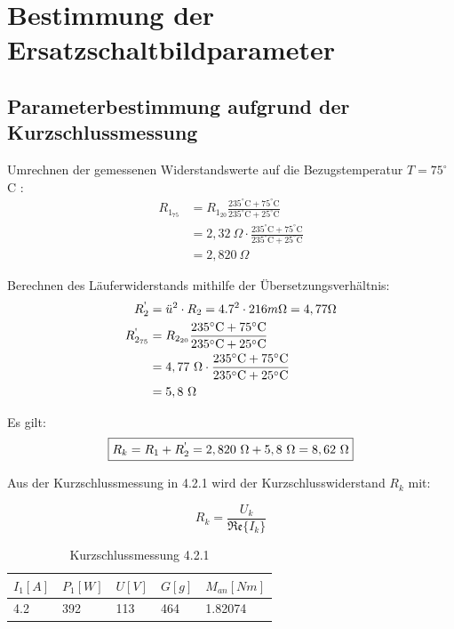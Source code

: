 \documentclass[conference]{IEEEtran}
\begin{document}
\section{Bestimmung der Ersatzschaltbildparameter}
\subsection{Parameterbestimmung aufgrund der Kurzschlussmessung}

Umrechnen der gemessenen Widerstandswerte auf die Bezugstemperatur $T=75^\circ$C :
\begin{align*}
    R_{1_{75}} & = R_{1_{20}}\frac{235^\circ\text{C}+75^\circ\text{C}}{235^\circ\text{C}+25^\circ\text{C}}         \\
               & = 2,32\ \Omega\cdot \frac{235^\circ\text{C}+75^\circ\text{C}}{235^\circ\text{C}+25^\circ\text{C}} \\
               & = 2,820\ \Omega
\end{align*}

Berechnen des Läuferwiderstands mithilfe der Übersetzungsverhältnis:
\begin{align*}
    R_2^\text{\textquotesingle}        & = \ddot{u}^2\cdot R_2 = 4.7^2 \cdot 216m\Omega   = 4,77 \Omega                                    \\
    R_{2_{75}}^\text{\textquotesingle} & = R_{2_{20}}\frac{235^\circ\text{C}+75^\circ\text{C}}{235^\circ\text{C}+25^\circ\text{C}}         \\
                                       & = 4,77\ \Omega\cdot \frac{235^\circ\text{C}+75^\circ\text{C}}{235^\circ\text{C}+25^\circ\text{C}} \\
                                       & = 5,8\ \Omega
\end{align*}

Es gilt:
\begin{equation} \label{eq:Kurzschlusswiderstand_gemessen}
    \boxed{R_k = R_1 + R_2^\text{\textquotesingle} = 2,820\ \Omega + 5,8\ \Omega = 8,62\ \Omega}
\end{equation}

Aus der Kurzschlussmessung in 4.2.1 wird der Kurzschlusswiderstand $R_k$ mit:

\begin{equation}
    \boxed{R_k = \frac{U_k}{\mathfrak{Re}\{I_k\}}}
\end{equation}

\begin{table}[htbp]
    \normalsize
    \def\arraystretch{1.5}
    \begin{tabularx}{\columnwidth}{XXXXX}
        \hline
        $I_1[A]$ & $P_1[W]$ & $U[V]$ & $G[g]$ & $M_{an}[Nm]$ \\
        \hline\hline
        4.2      & 392      & 113    & 464    & 1.82074      \\
        \hline
    \end{tabularx}
    \caption{Kurzschlussmessung 4.2.1}
    \label{tab:Kurzschlussmessung}
\end{table}
\end{document}
